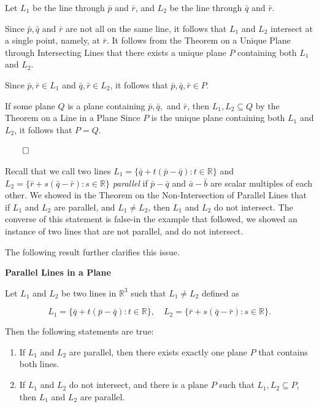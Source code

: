 \begin{proofbox}
  Let \(L_1\) be the line through \(\bar{p}\) and \(\bar{r}\), and \(L_2\) be the line through \(\bar{q}\) and \(\bar{r}\).

  \vspace{0.5em}

  Since \(\bar{p}, \bar{q}\) and \(\bar{r}\) are not all on the same line, it follows that \(L_1\) and \(L_2\) intersect at a single point, namely, at \(\bar{r}\).
  It follows from the Theorem on a Unique Plane through Intersecting Lines that there exists a unique plane \(P\) containing both \(L_1\) and \(L_2\).

  \vspace{0.5em}

  Since \(\bar{p},\bar{r} \in L_1\) and \(\bar{q},\bar{r} \in L_2\), it follows that \(\bar{p},\bar{q},\bar{r} \in P\).

  \vspace{0.5em}

  If some plane \(Q\) is a plane containing \(\bar{p},\bar{q},\) and \(\bar{r}\), then \(L_1,L_2 \subseteq Q\) by the Theorem on a Line in a Plane
  Since \(P\) is the unique plane containing both \(L_1\) and \(L_2\), it follows that \(P = Q\). 

  \hfill \(\qed\)

\end{proofbox}

\newpage

Recall that we call two lines \(L_1 = \{\bar{q} + t(\bar{p} - \bar{q}) : t \in \mathbb{R}\}\) and \(L_2 = \{\bar{r} + s(\bar{q} - \bar{r}) : s \in \mathbb{R}\}\)
\textit{parallel} if \(\bar{p} -\bar{q}\) and \(\bar{a}-\bar{b}\) are scalar multiples of each other. We showed in the Theorem on the Non-Intersection of Parallel Lines that
if \(L_1\) and \(L_2\) are parallel, and \(L_1 \neq L_2\), then \(L_1\) and \(L_2\) do not intersect. The converse of this statement is false-in the example that followed, we showed an instance
of two lines that are not parallel, and do not intersect. 

The following result further clarifies this issue.

\begin{theorembox}

  \textbf{Parallel Lines in a Plane}

Let \(L_1\) and \(L_2\) be two lines in \(\mathbb{R}^3\) such that \(L_1 \neq L_2\) defined as

\[
  L_1 = \{\bar{q} + t(\bar{p} - \bar{q}) : t \in \mathbb{R}\}, \quad
  L_2 = \{\bar{r} + s(\bar{q} - \bar{r}) : s \in \mathbb{R}\}.
\]

Then the following statements are true:
\begin{enumerate}[label=(\arabic*)]
  \item If \(L_1\) and \(L_2\) are parallel, then there exists exactly one plane \(P\) that contains both lines.
  \item If \(L_1\) and \(L_2\) do not intersect, and there is a plane \(P\) such that \(L_1,L_2 \subseteq P\), then \(L_1\) and \(L_2\) are parallel.
\end{enumerate}
\end{theorembox}

